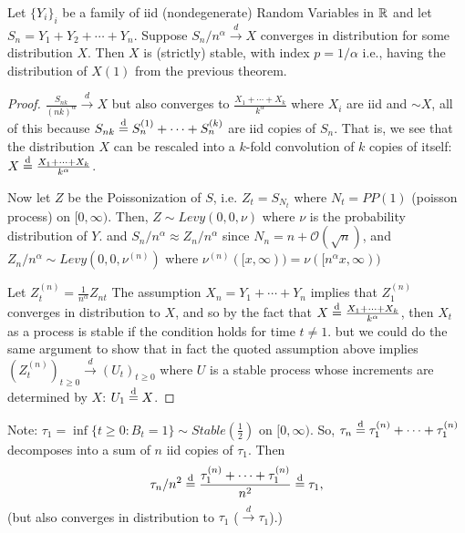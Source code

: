 \documentclass[../../../Master/AppliedStochastics.tex]{subfiles}
\begin{document}
\begin{definition}  Let $\{Y_i\}_{i} $ be a family of iid 
(nondegenerate) Random Variables in $\mathbb{R}$ and let $S_n = Y_1 + Y_2 + \cdots + 
Y_n$. Suppose $S_n / n^\alpha \overset{d}{\longrightarrow} X$ converges in 
distribution for some distribution $X$. Then $X$ is (strictly) stable, with 
index $p = 1/\alpha$ i.e., having the distribution of $X(1)$ from the previous 
theorem.
\end{definition}

\begin{proof}
$\frac{S_{nk}}{ (nk)^{\alpha} } \overset{d}{\longrightarrow} X$ but also 
converges to $\frac{ X_1 + \cdots + X_k }{k^\alpha}$ where $X_i$ are iid and 
$\sim X$, all of this because $S_{nk} \overset{ \text{d} }{=} S_n ^{(1)} + \cdots + S_n ^{(k)}$ 
are iid copies of $S_n$. That is, we see that the distribution $X$ can be 
rescaled into a $k$-fold convolution of $k$ copies of itself: $X \overset{ \text{d} }{=} \frac{ 
X_1 + \cdots + X_k }{k^\alpha}$.

\bigskip{}

Now let $Z$ be the Poissonization of $S$, i.e. $Z_t = S_{N_t}$ where $N_t = 
PP(1)$ (poisson process) on $[0, \infty)$. Then, $Z \sim Levy (0,0, \nu)$ where 
$\nu$ is the probability distribution of $Y$. and $S_n / n^\alpha \approx Z_n / 
n^\alpha$ since $N_n = n + \mathcal{O}(\sqrt{n})$, and $Z_n / n^\alpha \sim 
Levy(0,0, \nu^{(n)})$ where $\nu^{(n)} ( [x , \infty) ) = \nu( [n^\alpha x, 
\infty) )$

\bigskip{}

Let $Z^{(n)}_t = \frac{1}{n^\alpha} Z_{nt}$ The assumption $X_n = Y_1 + \cdots 
+ Y_n$ implies that $Z_1 ^{(n)}$ converges in distribution to $X$, and so by 
the fact that $X \overset{ \text{d} }{=} \frac{X_1 + \cdots + X_k}{k^\alpha}$, then $X_t$ as a 
process is stable if the condition holds for time $t \neq 1$. but we could do 
the same argument to show that in fact the quoted assumption above implies 
$(Z_t ^{(n)})_{t \geq 0} \overset{d}{\longrightarrow} (U_t)_{t \geq 0}$ where 
$U$ is a stable process whose increments are determined by $X$: $U_1 \overset{ \text{d} }{=} X$.

\end{proof}

Note: $\tau_1 = \inf \{ t \geq 0 : B_t = 1 \} \sim Stable(\tfrac{1}{2})$ on 
$[0, \infty)$. So, $\tau_n \overset{ \text{d} }{=} \tau_1 ^{(n)} + \cdots + \tau_1 ^{(n)}$ 
decomposes into a sum of $n$ iid copies of $\tau_1$. Then 
$$
\tau_n / n^2 \overset{ \text{d} }{=} \frac{\tau_1 ^{(n)} + \cdots + \tau_1 ^{(n)}}{n^2} \overset{ \text{d} }{=} 
\tau_1,
$$ 
(but also converges in distribution to $\tau_1$ ($\overset{d}{\longrightarrow} 
\tau_1$).)





%
\end{document}
